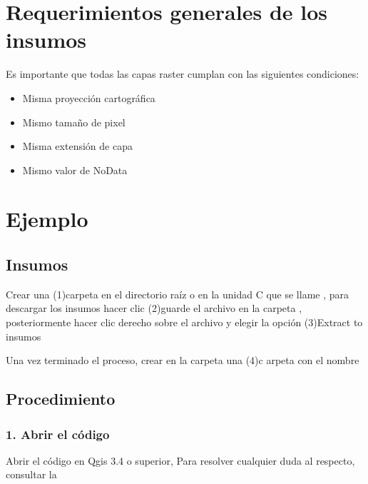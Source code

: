\documentclass[letterpaper,10pt,spanish]{sphinxmanual}
\begin{document}
\section{Requerimientos generales de los insumos}
\label{\detokenize{analisis:requerimientos-generales-de-los-insumos}}
Es importante que todas las capas raster cumplan con las siguientes condiciones:
\begin{itemize}
\item {} 
Misma proyección cartográfica

\item {} 
Mismo tamaño de pixel

\item {} 
Misma extensión de capa

\item {} 
Mismo valor de NoData

\end{itemize}


\section{Ejemplo}
\label{\detokenize{analisis:ejemplo}}

\subsection{Insumos}
\label{\detokenize{analisis:insumos}}
Crear una (1)carpeta en el directorio raíz o en la unidad C que se llame ,
para descargar los insumos hacer clic  (2)guarde el archivo 
en la carpeta , posteriormente hacer clic derecho sobre el archivo  y elegir la opción (3)Extract to insumos

\noindent{}

Una vez terminado el proceso, crear en la carpeta  una (4)c arpeta con el nombre 

\noindent{}


\subsection{Procedimiento}
\label{\detokenize{analisis:procedimiento}}

\subsubsection{1. Abrir el código}
\label{\detokenize{analisis:abrir-el-codigo}}
Abrir el código  en Qgis 3.4 o superior,
Para resolver cualquier duda al respecto, consultar la 
\end{document}
